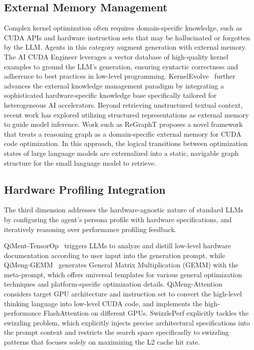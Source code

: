 \subsection{External Memory Management}

Complex kernel optimization often requires domain-specific knowledge, such as CUDA APIs and hardware instruction sets that may be hallucinated or forgotten by the LLM. Agents in this category augment generation with external memory. The AI CUDA Engineer \cite{lange2025ai} leverages a vector database of high-quality kernel examples to ground the LLM’s generation, ensuring syntactic correctness and adherence to best practices in low-level programming. KernelEvolve~\cite{liao2025kernelevolvescalingagentickernel} further advances the external knowledge management paradigm by integrating a sophisticated hardware-specific knowledge base specifically tailored for heterogeneous AI accelerators.
Beyond retrieving unstructured textual context, recent work has explored utilizing structured representations as external memory to guide model inference. Work such as ReGraphT \cite{gong2025large} proposes a novel framework that treats a reasoning graph as a domain-specific external memory for CUDA code optimization. In this approach, the logical transitions between optimization states of large language models are externalized into a static, navigable graph structure for the small language model to retrieve.


\subsection{Hardware Profiling Integration}

The third dimension addresses the hardware-agnostic nature of standard LLMs by configuring the agent's persona profile with hardware specifications, and iteratively reasoning over performance profiling feedback. 

QiMent-TensorOp~\cite{zhang2025qimeng} triggers LLMs to analyze and distill low-level hardware documentation according to user input into the generation prompt, while QiMeng-GEMM~\cite{zhou2025qimenggemm} generates General Matrix Multiplication (GEMM) with the meta-prompt, which offers universal templates for various general optimization techniques and platform-specific optimization details. QiMeng-Attention~\cite{zhou2025qimeng} considers  target GPU architecture and instruction set to convert the high-level thinking language into low-level CUDA code, and  implements the high-performance FlashAttention on different GPUs. SwizzlePerf \cite{tschand2025swizzleperf} explicitly tackles the swizzling problem, which explicitly injects precise architectural specifications into the prompt context and restricts the search space specificaslly to swizzling patterns that focuses solely on maximizing the L2 cache hit rate.


